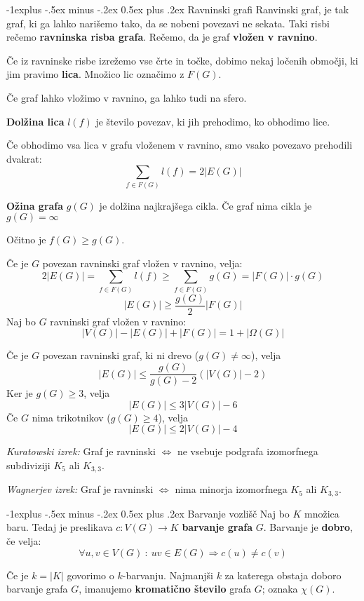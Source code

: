 \documentclass[a4paper,9pt]{extarticle}
\makeatletter
\renewcommand{\subsection}{\@startsection{subsection}{2}{0mm}%
                                {-1explus -.5ex minus -.2ex}%
                                {0.5ex plus .2ex}%
                                {\normalfont\normalsize\bfseries}}
\makeatother
\begin{document}
\begin{multicols}{3}
\subsection{Ravninski grafi}
Ranvinski graf, je tak graf, ki ga lahko narišemo tako, da se nobeni povezavi ne sekata. Taki risbi
rečemo \textbf{ravninska risba grafa}. Rečemo, da je graf \textbf{vložen v ravnino}.

Če iz ravninske risbe izrežemo vse črte in točke, dobimo nekaj ločenih območji, ki jim pravimo \textbf{lica}.
Množico lic označimo z $F(G)$.

Če graf lahko vložimo v ravnino, ga lahko tudi na sfero.

\textbf{Dolžina lica} $l(f)$ je število povezav, ki jih prehodimo, ko obhodimo lice.

Če obhodimo vsa lica v grafu vloženem v ravnino, smo vsako povezavo prehodili dvakrat:
\[\sum_{f \in F(G)} l(f) = 2|E(G)| \]


\textbf{Ožina grafa} $g(G)$ je dolžina najkrajšega cikla. Če graf nima cikla je $g(G) = \infty$

Očitno je $f(G) \geq g(G)$. 

Če je $G$ povezan ravninski graf vložen v ravnino, velja:
\[2|E(G)| = \sum_{f \in F(G)} l(f) \geq \sum_{f \in F(G)} g(G) = |F(G)|\cdot g(G) \]
\[ |E(G)| \geq \frac{g(G)}{2} |F(G)| \]
Naj bo $G$ ravninski graf vložen v ravnino:
\[|V(G)| - |E(G)| + |F(G)| = 1+|\Omega(G)| \]

Če je $G$ povezan ravninski graf, ki ni drevo ($ g(G) \neq \infty $), velja
\[ |E(G)| \leq \frac{g(G)}{g(G)-2}(|V(G)| -2) \]
Ker je $g(G) \geq 3$, velja
\[ |E(G)| \leq 3|V(G)| - 6\]
Če $G$ nima trikotnikov ($g(G) \geq 4$), velja
\[ |E(G)| \leq 2|V(G)| - 4\]

\emph{Kuratowski izrek:} Graf je ravninski $\Leftrightarrow$ ne vsebuje podgrafa izomorfnega subdiviziji
$K_5$ ali $K_{3,3}$.

\emph{Wagnerjev izrek:} Graf je ravninski $\Leftrightarrow$ nima minorja izomorfnega $K_5$ ali $K_{3,3}$.

\subsection{Barvanje vozlišč}
Naj bo $K$ množica baru. Tedaj je preslikava $c:V(G) \to K$ \textbf{barvanje grafa} $G$.
Barvanje je \textbf{dobro}, če velja:
\[\forall u,v \in V(G)\ :\ uv \in E(G) \Rightarrow c(u) \neq c(v)  \]

Če je $k = |K|$ govorimo o $k$-barvanju. Najmanjši $k$ za katerega obstaja doboro barvanje grafa $G$, imanujemo
\textbf{kromatično število} grafa $G$; oznaka $\chi(G)$.


\end{multicols}
\end{document}
